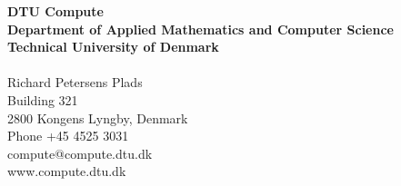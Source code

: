 \thispagestyle{empty} %
\frieze
\vspace*{\fill}
\noindent
\sffamily
\small
\textbf{DTU Compute}\\
\textbf{Department of Applied Mathematics and Computer Science}\\
\textbf{Technical University of Denmark}\\
\\
Richard Petersens Plads\\
Building 321\\
2800 Kongens Lyngby, Denmark\\
Phone +45 4525 3031\\
compute@compute.dtu.dk\\
www.compute.dtu.dk\\
\normalsize
\normalfont
\vspace*{2.5cm}

